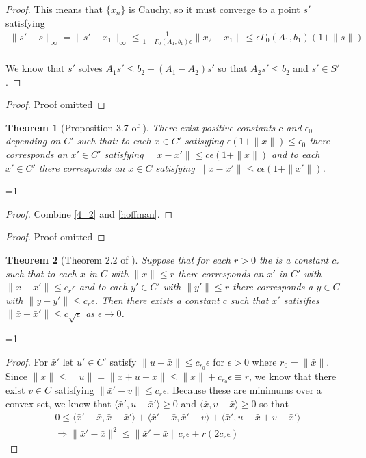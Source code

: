 \documentclass{article}
\newtheorem{theorem}{Theorem}[section]
\theoremstyle{case}
\newcommand{\xo}{{{\bar x}}}
\def\includeproofs{1}
\begin{document}
\begin{proof}
This means that $\{x_n\}$ is Cauchy, so it must converge to a point $s'$ satisfying
\begin{align*}
\|s' - s\|_\infty = \|s' - x_1\|_\infty \le \frac{1}{1 - \Gamma_0(A_1, b_1)\epsilon}\|x_2 - x_1\| \le \epsilon\Gamma_0(A_1, b_1)\left(1 + \|s\|\right) \\
\end{align*}

We know that $s'$ solves $A_1s' \le b_2 + (A_1 - A_2)s'$ so that $A_2s' \le b_2$ and $s' \in S'$.
\end{proof}

\else
\begin{proof}
Proof omitted
\end{proof}
\fi

\begin{theorem}[Proposition 3.7 of \cite{dummy:continuity}]
\label{3_7}
There exist positive constants $c$ and  $\epsilon_0$ depending on $C'$ such that:
to each $x \in C'$ satisyfing $\epsilon(1 + \|x\|) \le \epsilon_0$ there corresponds an $x' \in C'$ satisfying $\|x - x'\| \le c\epsilon(1 + \|x\|)$ and
to each $x' \in C'$ there corresponds an $x \in C$ satisfying $\|x - x'\| \le c \epsilon (1 + \|x'\|)$.
\end{theorem}

\ifnum\includeproofs=1
\begin{proof}
Combine \cref{4_2} and \cref{hoffman}.
\end{proof}
\else
\begin{proof}
Proof omitted
\end{proof}
\fi

\begin{theorem}[Theorem 2.2 of \cite{dummy:continuity}]
\label{2_2}
Suppose that for each $r > 0$ the is a constant $c_r$ such that to each 
$x$ in $C$ with $\|x\| \le r$ there corresponds an $x'$ in $C'$ with $\|x-x'\| \le c_r \epsilon$ and 
to each $y' \in C'$ with $\|y'\| \le r$ there corresponds a $y\in C$ with $\|y - y'\| \le c_r \epsilon$.
Then there exists a constant $c$ such that $\xo'$ satisifies $\|\bar x - \bar x '\|\le c \sqrt{\epsilon}$ as $\epsilon \to 0$.
\end{theorem}

\ifnum\includeproofs=1
\begin{proof}
For $\bar x'$ let $u' \in C'$ satisfy $\|u - \bar x\| \le c_{r_0} \epsilon$ for $\epsilon > 0$ where $r_0 = \|\bar x\|$.
Since $\|\bar x \| \le \|u\| = \|\bar x + u - \bar x\| \le \|\bar x \| + c_{r_0} \epsilon \equiv r$, we know that there exist 
$v \in C$ satisfying $\|\bar x' - v\| \le c_r \epsilon$.
Because these are minimums over a convex set, we know that
$\langle \xo', u - \xo'\rangle \ge 0$ and $\langle\xo, v-\xo\rangle \ge 0$ so that
\begin{align*}
0 \le \langle \xo' - \xo, \xo - \xo'\rangle + \langle \xo' - \xo, \xo'-v\rangle + \langle \xo', u - \xo + v - \xo'\rangle \\
\Longrightarrow \|\xo ' - \xo \|^2 \le \|\xo' - \xo\|c_r \epsilon + r(2c_r\epsilon)
\end{align*}
\end{proof}
\end{document}
